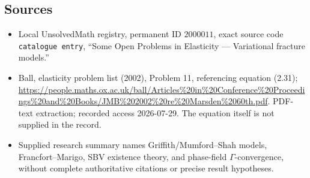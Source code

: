 \documentclass[11pt]{article}
\begin{document}
\subsection{Sources}
\begin{itemize}
\item Local UnsolvedMath registry, permanent ID \(2000011\), exact source code \texttt{catalogue entry}, ``Some Open Problems in Elasticity --- Variational fracture models.''
\item Ball, elasticity problem list (2002), Problem 11, referencing equation (2.31); \url{https://people.maths.ox.ac.uk/ball/Articles%20in%20Conference%20Proceedings%20and%20Books/JMB%202002%20re%20Marsden%2060th.pdf}. PDF-text extraction; recorded access 2026-07-29. The equation itself is not supplied in the record.
\item Supplied research summary names Griffith/Mumford--Shah models, Francfort--Marigo, SBV existence theory, and phase-field \(\Gamma\)-convergence, without complete authoritative citations or precise result hypotheses.
\end{itemize}
\end{document}
